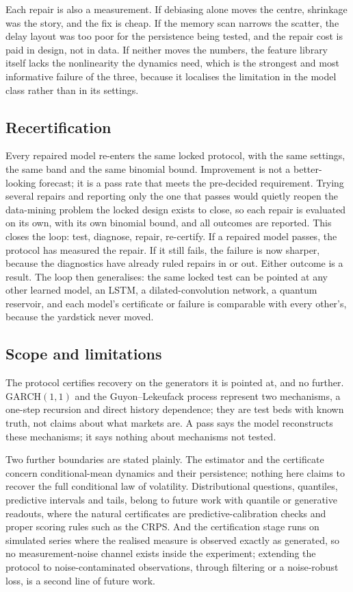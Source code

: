 \documentclass[12pt,a4paper]{article}
\begin{document}
Each repair is also a measurement. If debiasing alone moves the centre,
shrinkage was the story, and the fix is cheap. If the memory scan
narrows the scatter, the delay layout was too poor for the persistence
being tested, and the repair cost is paid in design, not in data. If
neither moves the numbers, the feature library itself lacks the
nonlinearity the dynamics need, which is the strongest and most
informative failure of the three, because it localises the limitation in
the model class rather than in its settings.

\subsection{Recertification}

Every repaired model re-enters the same locked protocol, with the same
settings, the same band and the same binomial bound. Improvement is not
a better-looking forecast; it is a pass rate that meets the pre-decided
requirement. Trying several repairs and reporting only the one that
passes would quietly reopen the data-mining problem the locked design
exists to close, so each repair is evaluated on its own, with its own
binomial bound, and all outcomes are reported. This closes the loop: test, diagnose, repair, re-certify.
If a repaired model passes, the protocol has measured the repair. If it
still fails, the failure is now sharper, because the diagnostics have
already ruled repairs in or out. Either outcome is a result. The loop
then generalises: the same locked test can be pointed at any other
learned model, an LSTM, a dilated-convolution network, a quantum
reservoir, and each model's certificate or failure is comparable with
every other's, because the yardstick never moved.

\subsection{Scope and limitations}

The protocol certifies recovery on the generators it is pointed at, and
no further. GARCH$(1,1)$ and the Guyon--Lekeufack process represent two
mechanisms, a one-step recursion and direct history dependence; they are
test beds with known truth, not claims about what markets are. A pass
says the model reconstructs these mechanisms; it says nothing about
mechanisms not tested.

Two further boundaries are stated plainly. The estimator and the
certificate concern conditional-mean dynamics and their persistence;
nothing here claims to recover the full conditional law of volatility.
Distributional questions, quantiles, predictive intervals and tails,
belong to future work with quantile or generative readouts, where the
natural certificates are predictive-calibration checks and proper
scoring rules such as the CRPS. And the
certification stage runs on simulated series where the realised measure
is observed exactly as generated, so no measurement-noise channel exists
inside the experiment;
extending the protocol to noise-contaminated observations, through
filtering or a noise-robust loss, is a second line of future work.
\end{document}
